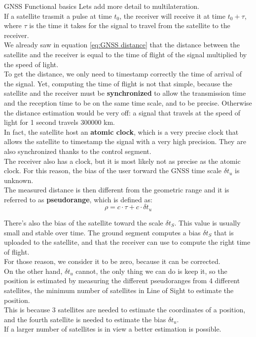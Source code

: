   \begin{section}{GNSS Functional basics}
    Lets add more detail to multilateration.\\
    If a satellite trasmit a pulse at time $t_0$, the receiver will receive it at time $t_0+\tau$,
    where $\tau$ is the time it takes for the signal to travel from the satellite to the receiver.\\
    We already saw in equation \ref{eq:GNSS distance} that the distance between the satellite and the
    receiver is equal to the time of flight of the signal multiplied by the speed of light.\\

    To get the distance, we only need to timestamp correctly the time of arrival of the signal.
    Yet, computing the time of flight is not that simple, because the satellite and the receiver
    must be \textbf{synchronized} to allow the transmission time and the reception time to be on the 
    same time scale, and to be precise. Otherwise the distance estimation would be very off: 
    a signal that travels at the speed of light for 1 second travels 300000 km.\\
    In fact, the satellite host an \textbf{atomic clock}, which is a very precise clock that allows
    the satellite to timestamp the signal with a very high precision. They are also synchronized thanks
    to the control segment.\\
    The receiver also has a clock, but it is most likely not as precise as the atomic clock. 
    For this reason, the bias of the user torward the GNSS time scale $\delta t_u$ is unknown.\\
    The measured distance is then different from the geometric range and it is referred
    to as \textbf{pseudorange}, which is defined as:
    \begin{equation}
      \rho = c \cdot \tau + c \cdot \delta t_u
      \label{eq:GNSS pseudorange}
    \end{equation}

    There's also the bias of the satellite toward the scale $\delta t_S$. 
    This value is usually small and stable over time. The ground segment computes a bias $\delta t_S$
    that is uploaded to the satellite, and that the receiver can use to compute the right time of 
    flight.\\
    For those reason, we consider it to be zero, because it can be corrected.\\

    On the other hand, $\delta t_u$ cannot, the only thing we can do is keep it, so the position 
    is estimated by measuring the different pseudoranges from 4 different satellites, the minimum
    number of satellites in Line of Sight to estimate the position.\\
    This is because 3 satellites are needed to estimate the coordinates of a position, and the fourth
    satellite is needed to estimate the bias $\delta t_u$.\\
    If a larger number of satellites is in view a better estimation is possible.\\


\end{section}
